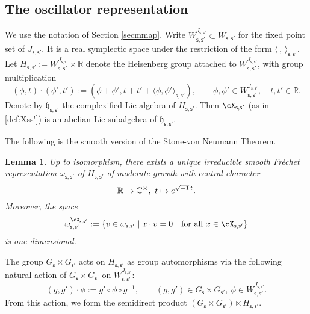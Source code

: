 \documentclass[12pt,a4paper]{amsart}
\newcommand{\h}{\mathfrak h}
\newcommand{\R}{\mathbb R}
\newcommand{\la}{\langle}
\newcommand{\ra}{\rangle}
\numberwithin{equation}{section}
\newtheorem{lem}[thm]{Lemma}
\theoremstyle{remark}
\begin{document}
\subsection{The oscillator representation}\label{secoscil}
We use the notation of Section \ref{secmmap}. Write
$
  W_{\mathsf s, \mathsf s'}^{J_{\mathsf s, \mathsf s'}}\subset W_{\mathsf s, \mathsf s'}
$
for the fixed point set of $J_{\mathsf s, \mathsf s'}$. It is a real symplectic space under the restriction of the form $\la\,,\,\ra_{\mathsf s, \mathsf s'}$. Let $H_{\mathsf s, \mathsf s'}:= W_{\mathsf s, \mathsf s'}^{J_{\mathsf s, \mathsf s'}}\times \R$
denote the Heisenberg group attached to $W_{\mathsf s, \mathsf s'}^{J_{\mathsf s, \mathsf s'}}$, with group multiplication
\[
  (\phi ,t)\cdot (\phi ', t'):=(\phi +\phi ', t+t'+\la \phi , \phi '\ra_{\mathsf s, \mathsf s'}), \qquad \phi ,\phi '\in  W_{\mathsf s, \mathsf s'}^{J_{\mathsf s, \mathsf s'}}, \quad t, t'\in \R.
\]
Denote by $\h_{\mathsf s, \mathsf s'}$ the complexified Lie algebra of $H_{\mathsf s, \mathsf s'}$. Then  $\cX_{\mathsf s, \mathsf s'}$ (as in \eqref{def:Xss'}) is  an abelian Lie subalgebra of $\h_{\mathsf s, \mathsf s'}$.

The following is the smooth version of the Stone-von Neumann Theorem.

\begin{lem}\label{vn}
Up to isomorphism, there exists a unique irreducible smooth Fr\'echet representation $\omega_{\mathsf s, \mathsf s'}$ of $H_{\mathsf s, \mathsf s'}$ of moderate growth with central character
\[
\R\rightarrow \C^\times, \ t\mapsto e^{\sqrt{-1}\, t}.
\]
Moreover, the space
\[
  \omega_{\mathsf s, \mathsf s'}^{\cX_{\mathsf s, \mathsf s'}}:=\{v\in \omega_{\mathsf s, \mathsf s'}\mid x \cdot v=0\quad \textrm{for all $x\in \cX_{\mathsf s, \mathsf s'}$}\}
\]
is one-dimensional.
\end{lem}



The group $G_{\mathsf s}\times G_{\mathsf s'}$ acts on $H_{\mathsf s, \mathsf s'}$ as group automorphisms via the following natural action of $G_{\mathsf s}\times G_{\mathsf s'}$ on  $W_{\mathsf s, \mathsf s'}^{J_{\mathsf s, \mathsf s'}}$:
\[
  (g, g')\cdot \phi:=g'\circ \phi\circ g^{-1}, \qquad (g,g')\in G_{\mathsf s}\times G_{\mathsf s'},\ \phi\in W_{\mathsf s, \mathsf s'}^{J_{\mathsf s, \mathsf s'}}.
\]
From this action, we form the semidirect product $(G_{\mathsf s}\times G_{\mathsf s'})\ltimes H_{\mathsf s, \mathsf s'}$.
\end{document}
